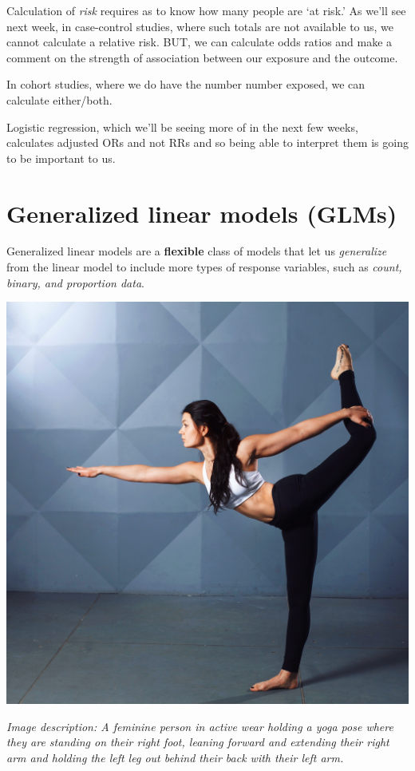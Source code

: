 \documentclass[
  openany]{book}
\begin{document}
Calculation of \emph{risk} requires as to know how many people are `at risk.'
As we'll see next week, in case-control studies, where such totals are
not available to us, we cannot calculate a relative risk. BUT, we can
calculate odds ratios and make a comment on the strength of association
between our exposure and the outcome.

In cohort studies, where we do have the number number exposed, we can
calculate either/both.

Logistic regression, which we'll be seeing more of in the next few
weeks, calculates adjusted ORs and not RRs and so being able to
interpret them is going to be important to us.

\hypertarget{generalized-linear-models-glms}{%
\section{Generalized linear models (GLMs)}\label{generalized-linear-models-glms}}

Generalized linear models are a \textbf{flexible} class of models that let us
\emph{generalize} from the linear model to include more types of response
variables, such as \emph{count, binary, and proportion data}.

\begin{center}\includegraphics[width=0.7\linewidth]{images/m4/flex} \end{center}

\emph{Image description: A feminine person in active wear holding a yoga pose
where they are standing on their right foot, leaning forward and
extending their right arm and holding the left leg out behind their back
with their left arm.}
\end{document}
